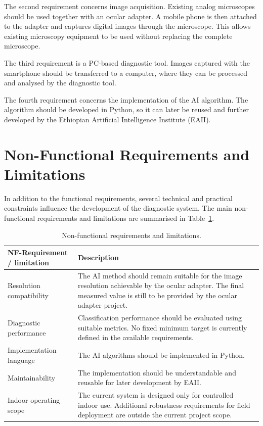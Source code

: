 The second requirement concerns image acquisition. Existing analog microscopes should be used together with an ocular adapter. A mobile phone is then attached to the adapter and captures digital images through the microscope. This allows existing microscopy equipment to be used without replacing the complete microscope.

The third requirement is a PC-based diagnostic tool. Images captured with the smartphone should be transferred to a computer, where they can be processed and analysed by the diagnostic tool.

The fourth requirement concerns the implementation of the AI algorithm. The algorithm should be developed in Python, so it can later be reused and further developed by the Ethiopian Artificial Intelligence Institute (EAII).

\section{Non-Functional Requirements and Limitations}
\label{sec:nonfunctional_requirements}

In addition to the functional requirements, several technical and practical constraints influence the development of the diagnostic system. The main non-functional requirements and limitations are summarised in Table~\ref{tab:nonfunctional_requirements}.

\begin{table}[htbp]
\centering
\caption{Non-functional requirements and limitations.}
\label{tab:nonfunctional_requirements}
\begin{tabularx}{\textwidth}{|p{4.2cm}|X|}
\hline
\textbf{NF-Requirement / limitation} & \textbf{Description} \\
\hline
Resolution compatibility &
The AI method should remain suitable for the image resolution achievable by the ocular adapter. The final measured value is still to be provided by the ocular adapter project. \\
\hline
Diagnostic performance &
Classification performance should be evaluated using suitable metrics. No fixed minimum target is currently defined in the available requirements. \\
\hline
Implementation language &
The AI algorithms should be implemented in Python. \\
\hline
Maintainability &
The implementation should be understandable and reusable for later development by EAII. \\
\hline
Indoor operating scope &
The current system is designed only for controlled indoor use. Additional robustness requirements for field deployment are outside the current project scope. \\
\hline
\end{tabularx}
\end{table}

